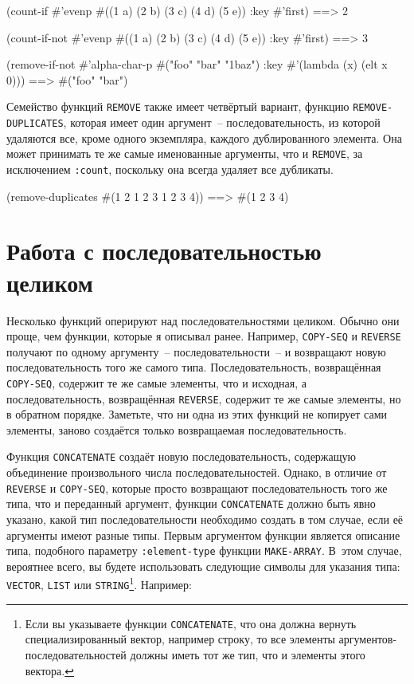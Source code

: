 \begin{myverb}
(count-if #'evenp #((1 a) (2 b) (3 c) (4 d) (5 e)) :key #'first)     ==> 2

(count-if-not #'evenp #((1 a) (2 b) (3 c) (4 d) (5 e)) :key #'first) ==> 3

(remove-if-not #'alpha-char-p
  #("foo" "bar" "1baz") :key #'(lambda (x) (elt x 0))) ==> #("foo" "bar")
\end{myverb}

Семейство функций \lstinline{REMOVE} также имеет четвёртый вариант, функцию
\lstinline{REMOVE-DUPLICATES}, которая имеет один аргумент~-- последовательность, из которой
удаляются все, кроме одного экземпляра, каждого дублированного элемента.  Она может
принимать те же самые именованные аргументы, что и \lstinline{REMOVE}, за исключением
\lstinline{:count}, поскольку она всегда удаляет все дубликаты.

\begin{myverb}
(remove-duplicates #(1 2 1 2 3 1 2 3 4)) ==> #(1 2 3 4)
\end{myverb}

\section{Работа с последовательностью целиком}

Несколько функций оперируют над последовательностями целиком.  Обычно
они проще, чем функции, которые я описывал ранее.  Например,
\lstinline{COPY-SEQ} и \lstinline{REVERSE} получают по одному аргументу~-- последовательности~-- и
возвращают новую последовательность того же самого типа.  Последовательность, возвращённая
\lstinline{COPY-SEQ}, содержит те же самые элементы, что и исходная,
а последовательность, возвращённая \lstinline{REVERSE}, содержит те же
самые элементы, но в обратном порядке.  Заметьте, что ни одна из этих функций не копирует
сами элементы, заново создаётся только возвращаемая последовательность.

Функция \lstinline{CONCATENATE} создаёт новую последовательность, содержащую объединение произвольного
числа последовательностей.  Однако, в отличие от \lstinline{REVERSE} и \lstinline{COPY-SEQ}, которые
просто возвращают последовательность того же типа, что и переданный аргумент, функции
\lstinline{CONCATENATE} должно быть явно указано, какой тип последовательности необходимо
создать в том случае, если её аргументы имеют разные типы.  Первым аргументом функции
является описание типа, подобного параметру \lstinline{:element-type} функции \lstinline{MAKE-ARRAY}.
В~этом случае, вероятнее всего, вы будете использовать следующие символы для указания типа:
\lstinline{VECTOR}, \lstinline{LIST} или \lstinline{STRING}\footnote{Если вы указываете функции
  \lstinline{CONCATENATE}, что она должна вернуть специализированный вектор, например строку,
  то все элементы аргументов-последовательностей должны иметь тот же тип, что и элементы
  этого вектора.}\hspace{\footnotenegspace}.  Например:

